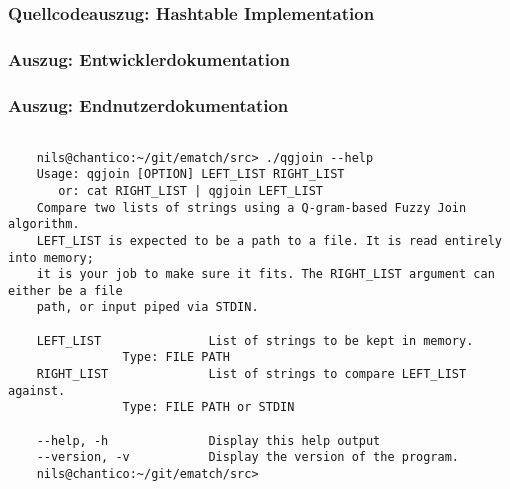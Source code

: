 \subsubsection{Quellcodeauszug: Hashtable Implementation}


\subsubsection{Auszug: Entwicklerdokumentation}


\subsubsection{Auszug: Endnutzerdokumentation}
\begin{lstlisting}[style=xterm, label=fig:cliHelp, caption=Ausgabe der Endnutzerdokumentation über den --help parameter]

	nils@chantico:~/git/ematch/src> ./qgjoin --help
	Usage: qgjoin [OPTION] LEFT_LIST RIGHT_LIST
	   or: cat RIGHT_LIST | qgjoin LEFT_LIST
	Compare two lists of strings using a Q-gram-based Fuzzy Join algorithm.
	LEFT_LIST is expected to be a path to a file. It is read entirely into memory;
	it is your job to make sure it fits. The RIGHT_LIST argument can either be a file
	path, or input piped via STDIN.
	
	LEFT_LIST               List of strings to be kept in memory.
				Type: FILE PATH
	RIGHT_LIST              List of strings to compare LEFT_LIST against.
				Type: FILE PATH or STDIN
	
	--help, -h              Display this help output
	--version, -v           Display the version of the program.
	nils@chantico:~/git/ematch/src>

\end{lstlisting}


